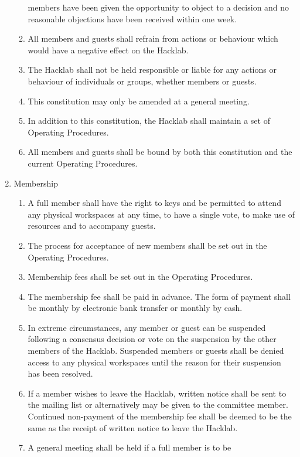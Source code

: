 \documentclass{article}
\begin{document}
\begin{enumerate}
\begin{enumerate}
      members have been given the opportunity to object to a decision
      and no reasonable objections have been received within one week.
    \item All members and guests shall refrain from actions or
      behaviour which would have a negative effect on the Hacklab.
    \item The Hacklab shall not be held responsible or liable for
      any actions or behaviour of individuals or groups, whether
      members or guests.
    \item This constitution may only be amended at a general meeting.
    \item In addition to this constitution, the Hacklab shall maintain
      a set of Operating Procedures.
    \item All members and guests shall be bound by both this
      constitution and the current Operating Procedures.
    \end{enumerate} %
  \item Membership
    \begin{enumerate}
    \item A full member shall have the right to keys and be permitted
      to attend any physical workspaces at any time, to have a single
      vote, to make use of resources and to accompany guests.
    \item The process for acceptance of new members shall be set out
      in the Operating Procedures.
    \item Membership fees shall be set out in the Operating Procedures.
    \item The membership fee shall be paid in advance. The form of
      payment shall be monthly by electronic bank transfer or monthly
      by cash.
    \item In extreme circumstances, any member or guest can be
      suspended following a consensus decision or vote on the
      suspension by the other members of the Hacklab. Suspended members
      or guests shall be denied access to any physical workspaces
      until the reason for their suspension has been resolved.
    \item If a member wishes to leave the Hacklab, written notice
      shall be sent to the mailing list or alternatively may be given
      to the committee member. Continued non-payment of the membership
      fee shall be deemed to be the same as the receipt of written
      notice to leave the Hacklab.
    \item A general meeting shall be held if a full member is to be

\end{enumerate}
\end{enumerate}
\end{document}
